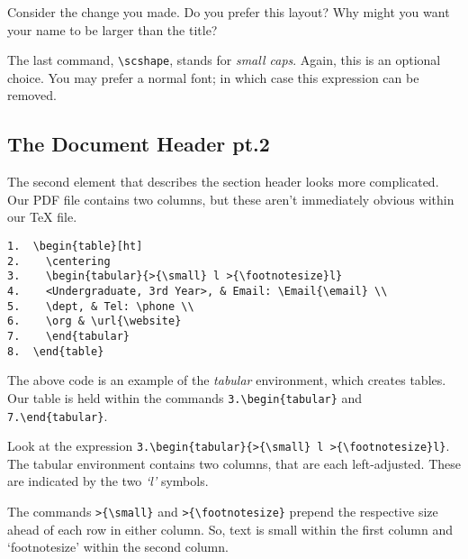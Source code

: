 \begin{qst}
Consider the change you made. Do you prefer this layout? Why might you want your name to be larger than the title?
\end{qst}

The last command, \lstinline|\scshape|, stands for \emph{small caps}. Again, this is an optional choice. You may prefer a normal font; in which case this expression can be removed. \par

\subsection{The Document Header pt.2}
The second element that describes the section header looks more complicated. Our PDF file contains two columns, but these aren't immediately obvious within our TeX file. \par

\begin{lstlisting}
1.  \begin{table}[ht]
2.    \centering
3.    \begin{tabular}{>{\small} l >{\footnotesize}l}
4.    <Undergraduate, 3rd Year>, & Email: \Email{\email} \\
5.    \dept, & Tel: \phone \\
6.    \org & \url{\website}
7.    \end{tabular}
8.  \end{table}
\end{lstlisting}

The above code is an example of the \emph{tabular} environment, which creates tables. Our table is held within the commands \lstinline|3.\begin{tabular}| and \lstinline|7.\end{tabular}|. \par

Look at the expression \lstinline|3.\begin{tabular}{>{\small} l >{\footnotesize}l}|. The tabular environment contains two columns, that are each left-adjusted. These are indicated by the two \emph{`l'} symbols. \par

The commands \lstinline|>{\small}| and \lstinline|>{\footnotesize}| prepend the respective size ahead of each row in either column. So, text is small within the first column and `footnotesize' within the second column. \par

